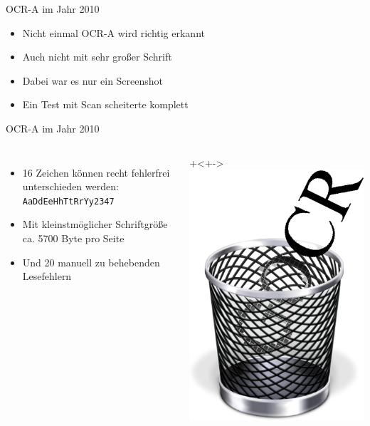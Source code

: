 \begin{frame}[<+->]{OCR-A im Jahr 2010}
	\begin{itemize}
	\item Nicht einmal OCR-A wird richtig erkannt
	\item Auch nicht mit sehr großer Schrift
	\item Dabei war es nur ein Screenshot
	\item Ein Test mit Scan scheiterte komplett
	\end{itemize}
\end{frame}

\begin{frame}{OCR-A im Jahr 2010}
	\begin{columns}
		\begin{itemize}
		\item<+-> 16 Zeichen können recht fehlerfrei unterschieden werden: \\ \texttt{AaDdEeHhTtRrYy2347}
		\item<+-> Mit kleinstmöglicher Schriftgröße ca. 5700 Byte pro Seite
		\item<+-> Und 20 manuell zu behebenden Lesefehlern
		\end{itemize}
		\onslide+<+->\includegraphics[width=\textwidth]{penma/trashcans/gocr.png}
	\end{columns}
\end{frame}

